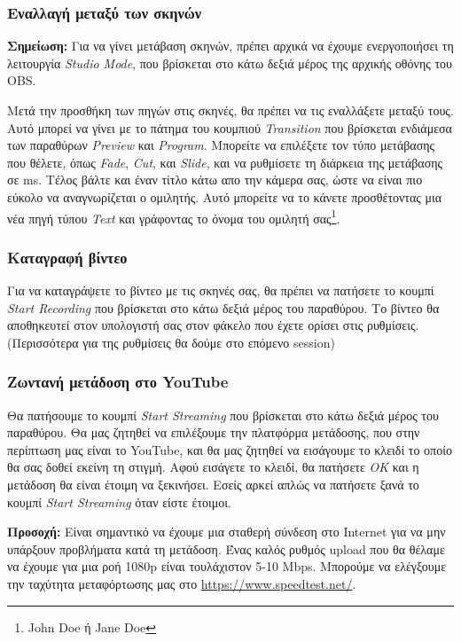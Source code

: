 \documentclass[12pt,a4paper]{article}
\begin{document}
\subsubsection{Εναλλαγή μεταξύ των σκηνών}
\begin{info}
  \textbf{Σημείωση:} Για να γίνει μετάβαση σκηνών, πρέπει αρχικά να έχουμε ενεργοποιήσει τη λειτουργία
  \textit{Studio Mode},  που βρίσκεται στο κάτω δεξιά μέρος της αρχικής οθόνης του OBS.
\end{info}
Μετά την προσθήκη των πηγών στις σκηνές, θα πρέπει να τις εναλλάξετε μεταξύ τους. Αυτό μπορεί να γίνει με το πάτημα
του κουμπιού \textit{Transition} που βρίσκεται ενδιάμεσα των παραθύρων \textit{Preview} και \textit{Program}.
Μπορείτε να επιλέξετε τον τύπο μετάβασης που θέλετε, όπως \textit{Fade}, \textit{Cut}, και \textit{Slide},
και να ρυθμίσετε τη διάρκεια της μετάβασης σε ms. Τέλος βάλτε και έναν τίτλο κάτω απο την κάμερα σας,
ώστε να είναι πιο εύκολο να αναγνωρίζεται ο ομιλητής. Αυτό μπορείτε να το κάνετε προσθέτοντας μια νέα πηγή
τύπου \textit{Text} και γράφοντας το όνομα του ομιλητή σας\footnote{John Doe ή Jane Doe}.
\subsubsection{Καταγραφή βίντεο}
Για να καταγράψετε το βίντεο με τις σκηνές σας, θα πρέπει να πατήσετε το κουμπί \textit{Start Recording} που βρίσκεται
στο κάτω δεξιά μέρος του παραθύρου. Το βίντεο θα αποθηκευτεί στον υπολογιστή σας στον φάκελο που έχετε ορίσει στις ρυθμίσεις.
(Περισσότερα για της ρυθμίσεις θα δούμε στο επόμενο session)
\subsubsection{Ζωντανή μετάδοση στο YouTube}
Θα πατήσουμε το κουμπί \textit{Start Streaming} που βρίσκεται στο κάτω δεξιά μέρος του παραθύρου. Θα μας ζητηθεί να
επιλέξουμε την πλατφόρμα μετάδοσης, που στην περίπτωση μας είναι το YouTube, και θα μας ζητηθεί να εισάγουμε το κλειδί
το οποίο θα σας δοθεί εκείνη τη στιγμή. Αφού εισάγετε το κλειδί, θα πατήσετε \textit{OK} και η μετάδοση θα είναι έτοιμη να
ξεκινήσει. Εσείς αρκεί απλώς να πατήσετε ξανά το κουμπί \textit{Start Streaming} όταν είστε έτοιμοι.
\begin{info}
\textbf{Προσοχή:} Είναι σημαντικό να έχουμε μια σταθερή σύνδεση στο Internet για να μην υπάρξουν προβλήματα κατά τη μετάδοση.
Ένας καλός ρυθμός upload που θα θέλαμε να έχουμε για μια ροή 1080p είναι τουλάχιστον 5-10 Mbps.
Μπορούμε να ελέγξουμε την ταχύτητα μεταφόρτωσης μας στο \url{https://www.speedtest.net/}.
\end{info}
\end{document}
